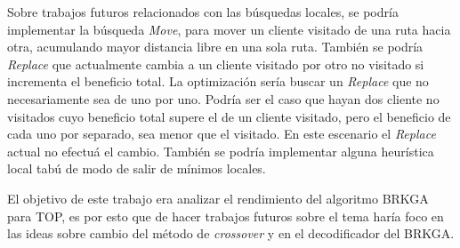 \bigskip

Sobre trabajos futuros relacionados con las búsquedas locales, se podría implementar la búsqueda \textit{Move}, para mover un cliente visitado de una ruta hacia otra, acumulando mayor distancia libre en una sola ruta. También se podría \textit{Replace} que actualmente cambia a un cliente visitado por otro no visitado si incrementa el beneficio total. La optimización sería buscar un \textit{Replace} que no necesariamente sea de uno por uno. Podría ser el caso que hayan dos cliente no visitados cuyo beneficio total supere el de un cliente visitado, pero el beneficio de cada uno por separado, sea menor que el visitado. En este escenario el \textit{Replace} actual no efectuá el cambio. También se podría implementar alguna heurística local tabú de modo de salir de mínimos locales.

\bigskip

El objetivo de este trabajo era analizar el rendimiento del algoritmo BRKGA para TOP, es por esto que de hacer trabajos futuros sobre el tema haría foco en las ideas sobre cambio del método de \textit{crossover} y en el decodificador del BRKGA.








